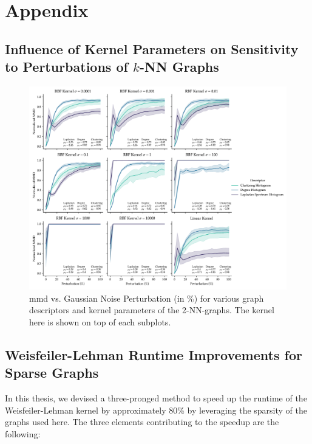 \chapter{Appendix}
\vspace{12pt}
\section{Influence of Kernel Parameters on Sensitivity to Perturbations of $k$-NN Graphs}

\begin{figure}[h]
  \centering
  \includegraphics[width=\textwidth]{./figures/results/res_1_5.pdf}
  \caption[\gls{mmd} vs. Gaussian Noise Perturbation (in \%) for various graph
descriptors of the 2-NN-graphs.]{\gls{mmd} vs. Gaussian Noise Perturbation (in \%) for
various graph descriptors and kernel parameters of the 2-NN-graphs. The kernel
here is shown on top of each subplots.}
  \label{fig:mmd_effect_kernel_knn}
\end{figure}


\section{Weisfeiler-Lehman Runtime Improvements for Sparse
  Graphs}\label{sec:sparse_wl}

In this thesis, we devised a three-pronged method to speed up the runtime of the
Weisfeiler-Lehman kernel by approximately 80\% by leveraging the sparsity of the
graphs used here. The three elements contributing to the speedup are the
following:

